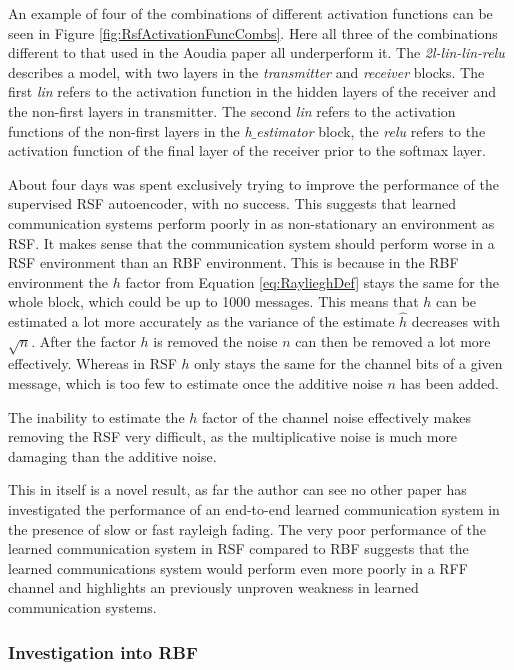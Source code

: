\documentclass[12pt,onecolumn,letterpaper]{article}
\newcommand{\code}{\textit}
\begin{document}
An example of four of the combinations of different activation functions can be seen in Figure \ref{fig:RsfActivationFuncCombs}. Here all three of the combinations different to that used in the Aoudia paper all underperform it. The \textit{2l-lin-lin-relu} describes a model, with two layers in the \code{transmitter} and \code{receiver} blocks. The first \code{lin} refers to the activation function in the hidden layers of the receiver and the non-first layers in transmitter. The second \code{lin} refers to the activation functions of the non-first layers in the \code{h$\_$estimator} block, the \code{relu} refers to the activation function of the final layer of the receiver prior to the softmax layer.

About four days was spent exclusively trying to improve the performance of the supervised RSF autoencoder, with no success. This suggests that learned communication systems perform poorly in as non-stationary an environment as RSF. It makes sense that the communication system should perform worse in a RSF environment than an RBF environment. This is because in the RBF environment the $h$ factor from Equation \ref{eq:RaylieghDef} stays the same for the whole block, which could be up to 1000 messages. This means that $h$ can be estimated a lot more accurately as the variance of the estimate $\hat{h}$ decreases with $\sqrt{n}$. After the factor $h$ is removed the noise $n$ can then be removed a lot more effectively. Whereas in RSF $h$ only stays the same for the channel bits of a given message, which is too few to estimate once the additive noise $n$ has been added. 

The inability to estimate the $h$ factor of the channel noise effectively makes removing the RSF very difficult, as the multiplicative noise is much more damaging than the additive noise. 

This in itself is a novel result, as far the author can see no other paper has investigated the performance of an end-to-end learned communication system in the presence of slow or fast rayleigh fading. The very poor performance of the learned communication system in RSF compared to RBF suggests that the learned communications system would perform even more poorly in a RFF channel and highlights an previously unproven weakness in learned communication systems.

\subsubsection{Investigation into RBF}
\end{document}
